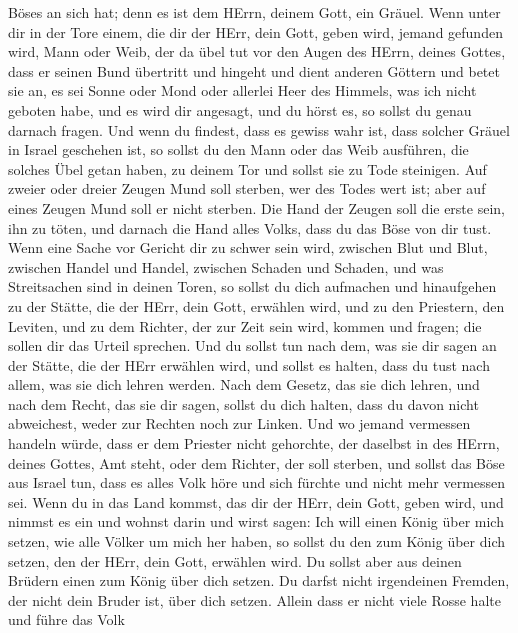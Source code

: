 Böses an sich hat; denn es ist dem HErrn, deinem Gott, ein Gräuel.
 Wenn unter dir in der Tore einem, die dir der HErr, dein
Gott, geben wird, jemand gefunden wird, Mann oder Weib, der da übel tut
vor den Augen des HErrn, deines Gottes, dass er seinen Bund übertritt
 und hingeht und dient anderen Göttern und betet sie an, es
sei Sonne oder Mond oder allerlei Heer des Himmels, was ich nicht
geboten habe,  und es wird dir angesagt, und du hörst es, so
sollst du genau darnach fragen. Und wenn du findest, dass es gewiss wahr
ist, dass solcher Gräuel in Israel geschehen ist,  so sollst
du den Mann oder das Weib ausführen, die solches Übel getan haben, zu
deinem Tor und sollst sie zu Tode steinigen.  Auf zweier
oder dreier Zeugen Mund soll sterben, wer des Todes wert ist; aber auf
eines Zeugen Mund soll er nicht sterben.  Die Hand der
Zeugen soll die erste sein, ihn zu töten, und darnach die Hand alles
Volks, dass du das Böse von dir tust.  Wenn eine Sache vor
Gericht dir zu schwer sein wird, zwischen Blut und Blut, zwischen Handel
und Handel, zwischen Schaden und Schaden, und was Streitsachen sind in
deinen Toren, so sollst du dich aufmachen und hinaufgehen zu der Stätte,
die der HErr, dein Gott, erwählen wird,  und zu den
Priestern, den Leviten, und zu dem Richter, der zur Zeit sein wird,
kommen und fragen; die sollen dir das Urteil sprechen.  Und
du sollst tun nach dem, was sie dir sagen an der Stätte, die der HErr
erwählen wird, und sollst es halten, dass du tust nach allem, was sie
dich lehren werden.  Nach dem Gesetz, das sie dich lehren,
und nach dem Recht, das sie dir sagen, sollst du dich halten, dass du
davon nicht abweichest, weder zur Rechten noch zur Linken. 
Und wo jemand vermessen handeln würde, dass er dem Priester nicht
gehorchte, der daselbst in des HErrn, deines Gottes, Amt steht, oder dem
Richter, der soll sterben, und sollst das Böse aus Israel tun,
 dass es alles Volk höre und sich fürchte und nicht mehr
vermessen sei.  Wenn du in das Land kommst, das dir der
HErr, dein Gott, geben wird, und nimmst es ein und wohnst darin und
wirst sagen: Ich will einen König über mich setzen, wie alle Völker um
mich her haben,  so sollst du den zum König über dich
setzen, den der HErr, dein Gott, erwählen wird. Du sollst aber aus
deinen Brüdern einen zum König über dich setzen. Du darfst nicht
irgendeinen Fremden, der nicht dein Bruder ist, über dich setzen.
 Allein dass er nicht viele Rosse halte und führe das Volk
